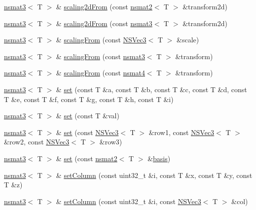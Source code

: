 \begin{DoxyCompactItemize}
\item 
\hyperlink{structnsmat3}{nsmat3}$<$ T $>$ \& \hyperlink{structnsmat3_a467f52cc19b2da599fbe08cfe984810b}{scaling2d\-From} (const \hyperlink{structnsmat2}{nsmat2}$<$ T $>$ \&transform2d)
\item 
\hyperlink{structnsmat3}{nsmat3}$<$ T $>$ \& \hyperlink{structnsmat3_af0d9cddc1799fd890b26edd1a4ba4eb5}{scaling2d\-From} (const \hyperlink{structnsmat3}{nsmat3}$<$ T $>$ \&transform2d)
\item 
\hyperlink{structnsmat3}{nsmat3}$<$ T $>$ \& \hyperlink{structnsmat3_a8c8a1f22ace08152d70a85948fb68bc0}{scaling\-From} (const \hyperlink{structNSVec3}{N\-S\-Vec3}$<$ T $>$ \&scale)
\item 
\hyperlink{structnsmat3}{nsmat3}$<$ T $>$ \& \hyperlink{structnsmat3_af9a2b8d8d9b45f6c1722e2d0552a21bf}{scaling\-From} (const \hyperlink{structnsmat3}{nsmat3}$<$ T $>$ \&transform)
\item 
\hyperlink{structnsmat3}{nsmat3}$<$ T $>$ \& \hyperlink{structnsmat3_a51af9af1bcc9a94f19a8a33cbbae1bad}{scaling\-From} (const \hyperlink{structnsmat4}{nsmat4}$<$ T $>$ \&transform)
\item 
\hyperlink{structnsmat3}{nsmat3}$<$ T $>$ \& \hyperlink{structnsmat3_a08f7143bc824dfc04bb77cee78620e4a}{set} (const T \&a, const T \&b, const T \&c, const T \&d, const T \&e, const T \&f, const T \&g, const T \&h, const T \&i)
\item 
\hyperlink{structnsmat3}{nsmat3}$<$ T $>$ \& \hyperlink{structnsmat3_a5601d4d2a9c1ded3cd664025de4dba15}{set} (const T \&val)
\item 
\hyperlink{structnsmat3}{nsmat3}$<$ T $>$ \& \hyperlink{structnsmat3_af18fa5d09b09be55280411cc40d1da16}{set} (const \hyperlink{structNSVec3}{N\-S\-Vec3}$<$ T $>$ \&row1, const \hyperlink{structNSVec3}{N\-S\-Vec3}$<$ T $>$ \&row2, const \hyperlink{structNSVec3}{N\-S\-Vec3}$<$ T $>$ \&row3)
\item 
\hyperlink{structnsmat3}{nsmat3}$<$ T $>$ \& \hyperlink{structnsmat3_ad1b1700ed17efc74c39124e1a11dd55e}{set} (const \hyperlink{structnsmat2}{nsmat2}$<$ T $>$ \&\hyperlink{structnsmat3_ab4f290c5d4071a2f54ad98481769fa81}{basis})
\item 
\hyperlink{structnsmat3}{nsmat3}$<$ T $>$ \& \hyperlink{structnsmat3_a90601d7efd36d0a1e24ff544b3c4108b}{set\-Column} (const uint32\-\_\-t \&i, const T \&x, const T \&y, const T \&z)
\item 
\hyperlink{structnsmat3}{nsmat3}$<$ T $>$ \& \hyperlink{structnsmat3_af9ee08ea92ea09acbd8b74b0cc687069}{set\-Column} (const uint32\-\_\-t \&i, const \hyperlink{structNSVec3}{N\-S\-Vec3}$<$ T $>$ \&col)

\end{DoxyCompactItemize}
